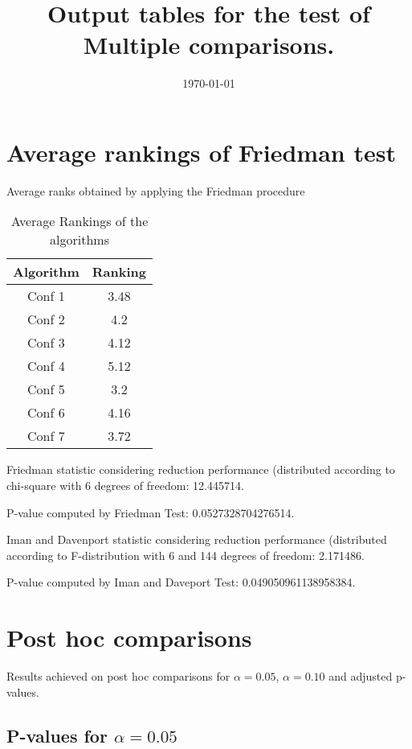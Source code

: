 \documentclass[a4paper,10pt]{article}
\title{Output tables for the test of Multiple comparisons.}
\author{}
\date{\today}
\begin{document}
\begin{landscape}
\pagestyle{empty}
\maketitle
\thispagestyle{empty}
\section{Average rankings of Friedman test}



Average ranks obtained by applying the Friedman procedure

\begin{table}[!htp]
\centering
\begin{tabular}{|c|c|}\hline
Algorithm&Ranking\\\hline
Conf 1 & 3.48\\
Conf 2 & 4.2\\
Conf 3 & 4.12\\
Conf 4 & 5.12\\
Conf 5 & 3.2\\
Conf 6 & 4.16\\
Conf 7 & 3.72\\
\hline
\end{tabular}
\caption{Average Rankings of the algorithms}
\end{table}

Friedman statistic considering reduction performance (distributed according to chi-square with 6 degrees of freedom: 12.445714.

P-value computed by Friedman Test: 0.0527328704276514.\newline

Iman and Davenport statistic considering reduction performance (distributed according to F-distribution with 6 and 144 degrees of freedom: 2.171486.

P-value computed by Iman and Daveport Test: 0.049050961138958384.\newline



\pagebreak

\section{Post hoc comparisons}

Results achieved on post hoc comparisons for $\alpha = 0.05$, $\alpha = 0.10$ and adjusted p-values.

\subsection{P-values for $\alpha=0.05$}


\end{landscape}
\end{document}
